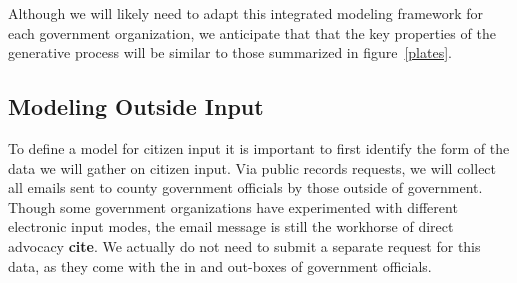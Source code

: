 Although we will likely need to adapt this integrated modeling
framework for each government organization, we anticipate that that
the key properties of the generative process will be similar to those
summarized in figure~\ref{plates}.







\subsection{Modeling Outside Input}

 To define a model for citizen input it is important to first identify the form of the data we will gather on citizen input. Via public records requests, we will collect all emails sent to county government officials by those outside of government. Though some government organizations have experimented with different electronic input modes, the email message is still the workhorse of direct advocacy {\bf cite}. We actually do not need to submit a separate request for this data, as they come with the in and out-boxes of government officials.

